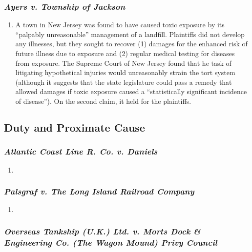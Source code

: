 \subsubsection{\emph{Ayers v. Township of Jackson}}

\begin{enumerate}
    \item A town in New Jersey was found to have caused toxic exposure by its ``palpably unreasonable'' management of a landfill. Plaintiffs did not develop any illnesses, but they sought to recover (1) damages for the enhanced risk of future illness due to exposure and (2) regular medical testing for diseases from exposure. The Supreme Court of New Jersey found that he task of litigating hypothetical injuries would unreasonably strain the tort system (although it suggests that the state legislature could pass a remedy that allowed damages if toxic exposure caused a ``statistically significant incidence of disease''). On the second claim, it held for the plaintiffs.
\end{enumerate}

\subsection{Duty and Proximate Cause}

\subsubsection{\emph{Atlantic Coast Line R. Co. v. Daniels}}

\begin{enumerate}
    \item
\end{enumerate}

\subsubsection{\emph{Palsgraf v. The Long Island Railroad Company}}

\begin{enumerate}
    \item
\end{enumerate}

\subsubsection{\emph{Overseas Tankship (U.K.) Ltd. v. Morts Dock \& Engineering Co. (The Wagon Mound) Privy Council}}

